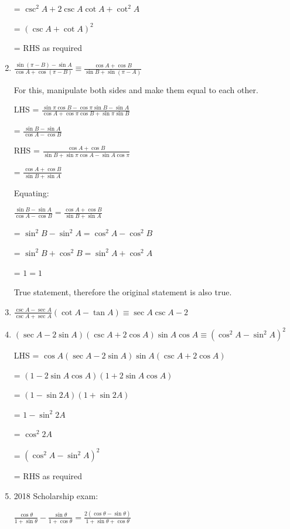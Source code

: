 \documentclass[../main.tex]{subfiles}
\begin{document}
\begin{enumerate}
    = $\csc^2{A}+2\csc{A}\cot{A}+\cot^2{A}$

    = $(\csc{A}+\cot{A})^2$

    = RHS as required

    \item $\frac{\sin{(\pi-B)}-\sin{A}}{\cos{A}+\cos{(\pi - B)}}\equiv \frac{\cos{A}+\cos{B}}{\sin{B}+\sin{(\pi - A)}}$
    
    For this, manipulate both sides and make them equal to each other.

    LHS = $\frac{\sin{\pi}\cos{B}-\cos{\pi}\sin{B}-\sin{A}}{\cos{A}+\cos{\pi}\cos{B}+\sin{\pi}\sin{B}}$

    = $\frac{\sin{B}-\sin{A}}{\cos{A}-\cos{B}}$

    RHS = $\frac{\cos{A}+\cos{B}}{\sin{B}+\sin{\pi}\cos{A}-\sin{A}\cos{\pi}}$

    = $\frac{\cos{A}+\cos{B}}{\sin{B}+\sin{A}}$

    Equating:

    $\frac{\sin{B}-\sin{A}}{\cos{A}-\cos{B}}=\frac{\cos{A}+\cos{B}}{\sin{B}+\sin{A}}$

    = $\sin^2{B}-\sin^2{A}=\cos^2{A}-\cos^2{B}$

    = $\sin^2{B}+\cos^2{B}=\sin^2{A}+\cos^2{A}$

    = $1 = 1$

    True statement, therefore the original statement is also true.

    \item $\frac{\csc{A}-\sec{A}}{\csc{A}+\sec{A}}(\cot{A}-\tan{A})\equiv \sec{A}\csc{A}-2$
    
    \item $(\sec{A}-2\sin{A})(\csc{A}+2\cos{A})\sin{A}\cos{A}\equiv (\cos^2{A}-\sin^2{A})^2$
    
    LHS = $\cos{A}(\sec{A}-2\sin{A})\sin{A}(\csc{A}+2\cos{A})$

    = $(1-2\sin{A}\cos{A})(1+2\sin{A}\cos{A})$

    = $(1-\sin{2A})(1+\sin{2A})$

    = $1-\sin^2{2A}$

    = $\cos^2{2A}$

    = $(\cos^2{A}-\sin^2{A})^2$

    = RHS as required

    \item 2018 Scholarship exam:
    
    $\frac{\cos{\theta}}{1+\sin{\theta}}-\frac{\sin{\theta}}{1+\cos{\theta}}=\frac{2(\cos{\theta}-\sin{\theta})}{1+\sin{\theta}+\cos{\theta}}$


\end{enumerate}
\end{document}
